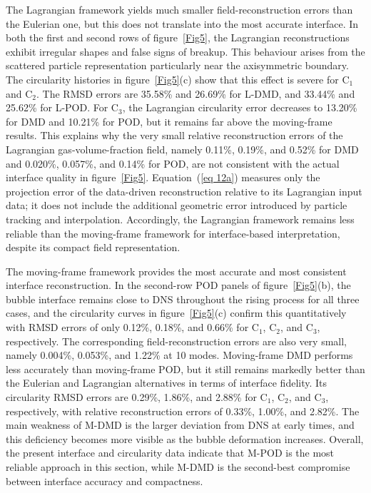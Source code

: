 \documentclass[a4paper,fleqn]{cas-sc}
\begin{document}
	The Lagrangian framework yields much smaller field-reconstruction errors than the Eulerian one, but this does not translate into the most accurate interface. In both the first and second rows of figure~\ref{Fig5}, the Lagrangian reconstructions exhibit irregular shapes and false signs of breakup. This behaviour arises from the scattered particle representation particularly near the axisymmetric boundary. The circularity histories in figure~\ref{Fig5}(c) show that this effect is severe for C$_1$ and C$_2$. The RMSD errors are 35.58\% and 26.69\% for L-DMD, and 33.44\% and 25.62\% for L-POD. For C$_3$, the Lagrangian circularity error decreases to 13.20\% for DMD and 10.21\% for POD, but it remains far above the moving-frame results. This explains why the very small relative reconstruction errors of the Lagrangian gas-volume-fraction field, namely 0.11\%, 0.19\%, and 0.52\% for DMD and 0.020\%, 0.057\%, and 0.14\% for POD, are not consistent with the actual interface quality in figure~\ref{Fig5}. Equation~(\ref{eq 12a}) measures only the projection error of the data-driven reconstruction relative to its Lagrangian input data; it does not include the additional geometric error introduced by particle tracking and interpolation. Accordingly, the Lagrangian framework remains less reliable than the moving-frame framework for interface-based interpretation, despite its compact field representation.
	
	The moving-frame framework provides the most accurate and most consistent interface reconstruction. In the second-row POD panels of figure~\ref{Fig5}(b), the bubble interface remains close to DNS throughout the rising process for all three cases, and the circularity curves in figure~\ref{Fig5}(c) confirm this quantitatively with RMSD errors of only 0.12\%, 0.18\%, and 0.66\% for C$_1$, C$_2$, and C$_3$, respectively. The corresponding field-reconstruction errors are also very small, namely 0.004\%, 0.053\%, and 1.22\% at 10 modes. Moving-frame DMD performs less accurately than moving-frame POD, but it still remains markedly better than the Eulerian and Lagrangian alternatives in terms of interface fidelity. Its circularity RMSD errors are 0.29\%, 1.86\%, and 2.88\% for C$_1$, C$_2$, and C$_3$, respectively, with relative reconstruction errors of 0.33\%, 1.00\%, and 2.82\%. The main weakness of M-DMD is the larger deviation from DNS at early times, and this deficiency becomes more visible as the bubble deformation increases. Overall, the present interface and circularity data indicate that M-POD is the most reliable approach in this section, while M-DMD is the second-best compromise between interface accuracy and compactness.
	
\end{document}
